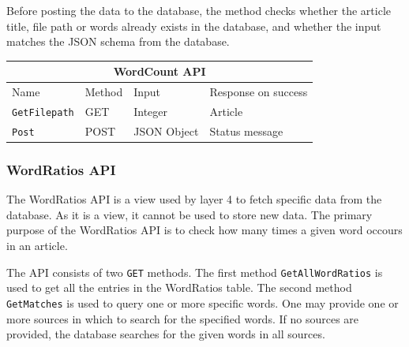 Before posting the data to the database, the method checks whether the article title, file path or words already exists in the database, and whether the input matches the JSON schema from the database.

\begin{table}[]
\begin{tabular}{|llll|}
\hline
\multicolumn{4}{|c|}{\textbf{WordCount API}}                                                                                 \\ \hline
\multicolumn{1}{|l|}{Name}                 & \multicolumn{1}{l|}{Method} & \multicolumn{1}{l|}{Input}       & Response on success       \\ \hline
\multicolumn{1}{|l|}{\texttt{GetFilepath}} & \multicolumn{1}{l|}{GET}    & \multicolumn{1}{l|}{Integer}     & Article        \\ \hline
\multicolumn{1}{|l|}{\texttt{Post}}        & \multicolumn{1}{l|}{POST}   & \multicolumn{1}{l|}{JSON Object} & Status message \\ \hline
\end{tabular}
\end{table}


\subsubsection{WordRatios API}
The WordRatios API is a view used by layer 4 to fetch specific data from the database.
As it is a view, it cannot be used to store new data. 
The primary purpose of the WordRatios API is to check how many times a given word occours in an article.

The API consists of two \texttt{GET} methods. 
The first method \texttt{GetAllWordRatios} is used to get all the entries in the WordRatios table.
The second method \texttt{GetMatches} is used to query one or more specific words. 
One may provide one or more sources in which to search for the specified words.
If no sources are provided, the database searches for the given words in all sources.

